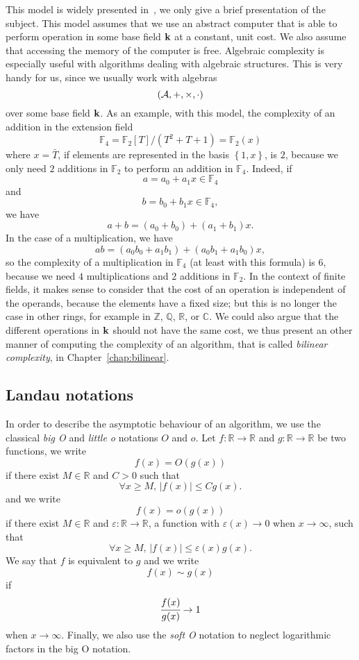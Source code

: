 This model is widely presented in~\cite{BCS13}, we only give a brief
presentation of the subject. This model assumes that we use an abstract computer
that is able to perform operation in some base field $\mathbf{k}$ at a constant, unit
cost. We also assume that accessing the memory of the computer is free.
Algebraic complexity is especially useful with algorithms dealing with
algebraic structures. This is very handy for us, since
we usually work with algebras
\[
  (\mathcal{A}, +, \times, \cdot)
\]
over some base field $\mathbf{k}$. As an example, with this model, the complexity of an
addition in the extension field
\[
  \mathbb{F}_4 = \mathbb{F}_2[T]/(T^2+T+1) = \mathbb{F}_2(x)
\]
where $x=\bar T$, if elements are represented in the basis $\left\{ 1, x
\right\}$, is $2$, because we only need $2$ additions in $\mathbb{F}_2$ to
perform an addition in $\mathbb{F}_4$. Indeed, if
\[
  a = a_0 + a_1x\in\mathbb{F}_4
\]
and
\[
  b = b_0 + b_1x\in\mathbb{F}_4,
\]
we have
\[
  a+b = (a_0+b_0)+(a_1+b_1)x.
\]
In the case of a multiplication, we have
\[
  ab = (a_0b_0+a_1b_1) + (a_0b_1+a_1b_0)x,
\]
so the complexity of a multiplication in $\mathbb{F}_4$ (at least with this
formula) is $6$, because we need
$4$ multiplications and $2$ additions in $\mathbb{F}_2$. In the context of
finite fields, it makes sense to consider that the cost of an operation is
independent of the operands, because the elements have a fixed size; but this is
no longer the case in other rings, for example in $\mathbb{Z}$, $\mathbb{Q}$,
$\mathbb{R}$, or $\mathbb{C}$. We could also argue that the different operations
in $\mathbf{k}$ should not have the same cost, we thus present an other manner of
computing the complexity of an algorithm, that is called \emph{bilinear
complexity}, in Chapter~\ref{chap:bilinear}.

\subsection{Landau notations}

In order to describe the asymptotic behaviour of an algorithm, we use the
classical \emph{big O} and \emph{little o} notations $O$ and $o$. Let $f:\mathbb{R}\to\mathbb{R}$ and
$g:\mathbb{R}\to\mathbb{R}$ be two functions, we write
\[
  f(x) = O(g(x))
\]
if there exist $M\in\mathbb{R}$ and $C>0$ such that
\[
  \forall x\geq M,\,|f(x)|\leq Cg(x).
\]
and we write
\[
  f(x)=o(g(x))
\]
if there exist $M\in\mathbb{R}$ and $\varepsilon:\mathbb{R}\to\mathbb{R}$, a
function with $\varepsilon(x)\to 0$ when $x\to\infty$, such
that
\[
  \forall x\geq M,\,|f(x)|\leq \varepsilon(x)g(x).
\]
We say that $f$ is equivalent to $g$ and we write
\[
  f(x)\sim g(x)
\]
if 
\[
  \cfrac{f(x)}{g(x)}\to 1
\]
when $x\to\infty$. Finally, we also use the \emph{soft O} notation to neglect
logarithmic factors in the big O notation.
